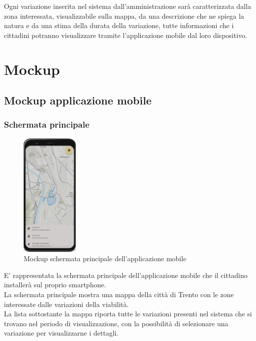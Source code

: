 \documentclass{article}
\begin{document}
Ogni variazione inserita nel sistema dall'amministrazione sarà caratterizzata dalla zona interessata, visualizzabile sulla mappa, da una descrizione che ne spiega la natura e da una stima della durata della variazione, tutte informazioni che i cittadini potranno visualizzare tramite l'applicazione mobile dal loro dispositivo.
\clearpage

\section{Mockup}
\subsection{Mockup applicazione mobile}

\subsubsection{Schermata principale}
\begin{figure}[htbp]
    \centering
    \includegraphics[width=0.25\textwidth]{Images/Mockup1 - Mobile.png}
    \caption{Mockup schermata principale dell'applicazione mobile}
\end{figure}

E' rappresentata la schermata principale dell'applicazione mobile che il cittadino installerà sul proprio smartphone.\\
La schermata principale mostra una mappa della città di Trento con le zone interessate dalle variazioni della viabilità.\\
La lista sottostante la mappa riporta tutte le variazioni presenti nel sistema che si trovano nel periodo di visualizzazione, con la possibilità di selezionare una variazione per visualizzarne i dettagli.\\
\clearpage
\end{document}
